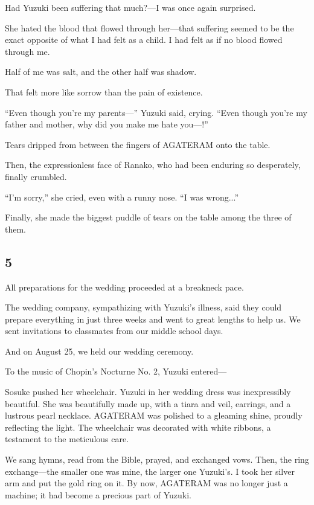 \documentclass[
    a4paper,
    12pt,
    twoside,
    openany,
    UTF8,
    fontset=windows
]{ctexbook}
\begin{document}
Had Yuzuki been suffering that much?---I was once again surprised.

She hated the blood that flowed through her---that suffering seemed to be the exact opposite of what I had felt as a child. I had felt as if no blood flowed through me.

Half of me was salt, and the other half was shadow.

That felt more like sorrow than the pain of existence.

``Even though you're my parents---'' Yuzuki said, crying. ``Even though you're my father and mother, why did you make me hate you---!''

Tears dripped from between the fingers of AGATERAM onto the table.

Then, the expressionless face of Ranako, who had been enduring so desperately, finally crumbled.

``I'm sorry,'' she cried, even with a runny nose. ``I was wrong...''

Finally, she made the biggest puddle of tears on the table among the three of them.


\subsection*{5}

All preparations for the wedding proceeded at a breakneck pace.

The wedding company, sympathizing with Yuzuki's illness, said they could prepare everything in just three weeks and went to great lengths to help us. We sent invitations to classmates from our middle school days.

And on August 25, we held our wedding ceremony.

To the music of Chopin's Nocturne No. 2, Yuzuki entered---

Sosuke pushed her wheelchair. Yuzuki in her wedding dress was inexpressibly beautiful. She was beautifully made up, with a tiara and veil, earrings, and a lustrous pearl necklace. AGATERAM was polished to a gleaming shine, proudly reflecting the light. The wheelchair was decorated with white ribbons, a testament to the meticulous care.

We sang hymns, read from the Bible, prayed, and exchanged vows. Then, the ring exchange---the smaller one was mine, the larger one Yuzuki's. I took her silver arm and put the gold ring on it. By now, AGATERAM was no longer just a machine; it had become a precious part of Yuzuki.
\end{document}
